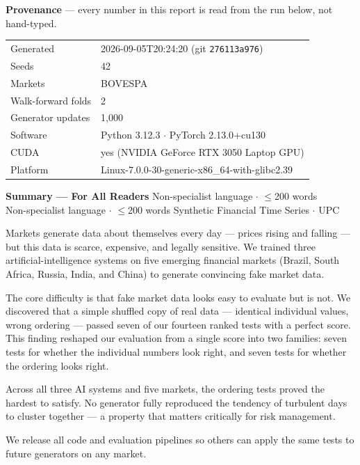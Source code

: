 \documentclass[10pt]{article}
\newcommand{\pagehead}[2]{%
  \begin{tcolorbox}[enhanced,arc=0pt,outer arc=0pt,boxrule=0pt,
    colback=Navy,colframe=Navy,
    top=5pt,bottom=5pt,left=8pt,right=8pt,
    before skip=0pt,after skip=10pt]
  {\color{white}\large\bfseries #1}%
  \ifx\relax#2\relax\else\\[1pt]{\color{blue!30!white}\small #2}\fi
  \hfill{\color{blue!20!white}\footnotesize Synthetic Financial Time Series $\cdot$ UPC}
  \end{tcolorbox}}
\begin{document}
\begin{tcolorbox}[enhanced,arc=3pt,boxrule=0.8pt,
  colframe=Navy,colback=LBg,left=8pt,right=8pt,top=5pt,bottom=5pt]
\small\textbf{Provenance} --- every number in this report is read from the run below, not hand-typed.
\begin{tabular}{@{}ll@{}}
Generated & 2026-09-05T20:24:20 (git \texttt{276113a976}) \\
Seeds & 42 \\
Markets & BOVESPA \\
Walk-forward folds & 2 \\
Generator updates & 1,000 \\
Software & Python 3.12.3 $\cdot$ PyTorch 2.13.0+cu130 \\
CUDA & yes (NVIDIA GeForce RTX 3050 Laptop GPU) \\
Platform & Linux-7.0.0-30-generic-x86\_64-with-glibc2.39\\
\end{tabular}
\end{tcolorbox}


\pagehead{Summary --- For All Readers}
         {Non-specialist language $\cdot$ $\leq$200 words}

\begin{tcolorbox}[enhanced,arc=4pt,boxrule=1pt,colframe=Teal,colback=TealBg,
  top=6pt,bottom=6pt,left=8pt,right=8pt,before skip=4pt,after skip=8pt]
\small
Markets generate data about themselves every day --- prices rising and falling --- but this data is scarce, expensive, and legally sensitive.
We trained three artificial-intelligence systems on five emerging financial markets (Brazil, South Africa, Russia, India, and China) to generate convincing fake market data.

The core difficulty is that fake market data looks easy to evaluate but is not.
We discovered that a simple shuffled copy of real data --- identical individual values, wrong ordering --- passed seven of our fourteen ranked tests with a perfect score.
This finding reshaped our evaluation from a single score into two families: seven tests for whether the individual numbers look right, and seven tests for whether the ordering looks right.

Across all three AI systems and five markets, the ordering tests proved the hardest to satisfy.
No generator fully reproduced the tendency of turbulent days to cluster together --- a property that matters critically for risk management.

We release all code and evaluation pipelines so others can apply the same tests to future generators on any market.
\end{tcolorbox}
\end{document}
